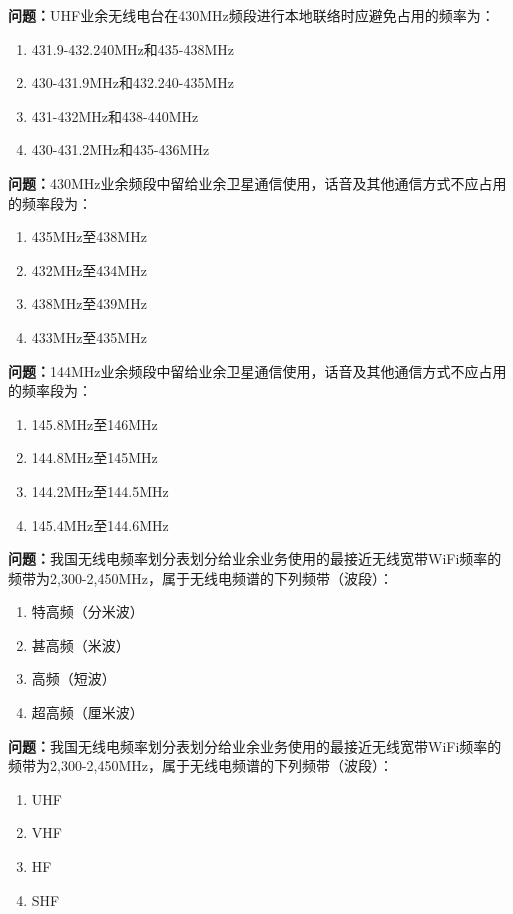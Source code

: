 \bigskip


\noindent\textbf{问题：}UHF业余无线电台在430MHz频段进行本地联络时应避免占用的频率为：
\begin{enumerate}[label=\Alph*), leftmargin=3em]
\item 431.9-432.240MHz和435-438MHz
\item 430-431.9MHz和432.240-435MHz
\item 431-432MHz和438-440MHz
\item 430-431.2MHz和435-436MHz
\end{enumerate}

\bigskip


\noindent\textbf{问题：}430MHz业余频段中留给业余卫星通信使用，话音及其他通信方式不应占用的频率段为：
\begin{enumerate}[label=\Alph*), leftmargin=3em]
\item 435MHz至438MHz
\item 432MHz至434MHz
\item 438MHz至439MHz
\item 433MHz至435MHz
\end{enumerate}

\bigskip


\noindent\textbf{问题：}144MHz业余频段中留给业余卫星通信使用，话音及其他通信方式不应占用的频率段为：
\begin{enumerate}[label=\Alph*), leftmargin=3em]
\item 145.8MHz至146MHz
\item 144.8MHz至145MHz
\item 144.2MHz至144.5MHz
\item 145.4MHz至144.6MHz
\end{enumerate}

\bigskip


\noindent\textbf{问题：}我国无线电频率划分表划分给业余业务使用的最接近无线宽带WiFi频率的频带为2,300-2,450MHz，属于无线电频谱的下列频带（波段）：
\begin{enumerate}[label=\Alph*), leftmargin=3em]
\item 特高频（分米波）
\item 甚高频（米波）
\item 高频（短波）
\item 超高频（厘米波）
\end{enumerate}

\bigskip


\noindent\textbf{问题：}我国无线电频率划分表划分给业余业务使用的最接近无线宽带WiFi频率的频带为2,300-2,450MHz，属于无线电频谱的下列频带（波段）：
\begin{enumerate}[label=\Alph*), leftmargin=3em]
\item UHF
\item VHF
\item HF
\item SHF
\end{enumerate}

